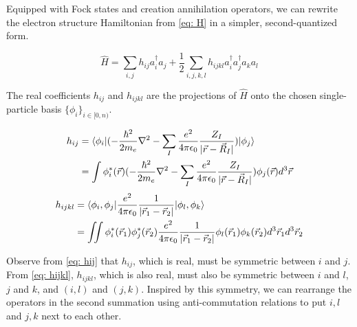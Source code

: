 Equipped with Fock states and creation annihilation operators, we can rewrite the electron structure Hamiltonian from \eqref{eq: H} in a simpler, second-quantized form.

\begin{equation}
    \hat{H} = \sum_{i, j} h_{ij}a^\dag_ia_j + \frac{1}{2}\sum_{i,j,k,l} h_{ijkl}a^\dag_ia^\dag_ja_ka_l \label{eq: H2}
\end{equation}

The real coefficients $h_{ij}$ and $h_{ijkl}$ are the projections of $\hat{H}$ onto the chosen single-particle basis $\{\phi_i\}_{i \in [0, n)}$.

\begin{equation}
    \begin{split}
        h_{ij} &= \braket{\phi_i | (-\frac{\hbar^2}{2m_e}\nabla^2 - \sum_I \frac{e^2}{4\pi\epsilon_0}\frac{Z_I}{|\vec{r} - \vec{R}_I|}) | \phi_j} \\
        &= \int \phi^*_i(\vec{r})(-\frac{\hbar^2}{2m_e}\nabla^2 - \sum_I \frac{e^2}{4\pi\epsilon_0}\frac{Z_I}{|\vec{r} - \vec{R}_I|})\phi_j(\vec{r}) d^3\vec{r}
    \end{split}
    \label{eq: hij}
\end{equation}
\begin{equation}
    \begin{split}
        h_{ijkl} &= \braket{\phi_i, \phi_j | \frac{e^2}{4\pi\epsilon_0}\frac{1}{|\vec{r}_1 - \vec{r}_2|} | \phi_l, \phi_k} \\
        &= \iint \phi^*_i(\vec{r}_1)\phi^*_j(\vec{r}_2)\frac{e^2}{4\pi\epsilon_0}\frac{1}{|\vec{r}_1 - \vec{r}_2|}\phi_l(\vec{r}_1)\phi_k(\vec{r}_2) d^3\vec{r}_1d^3\vec{r}_2
    \end{split}
    \label{eq: hijkl}
\end{equation}

Observe from \eqref{eq: hij} that $h_{ij}$, which is real, must be symmetric between $i$ and $j$. From \eqref{eq: hijkl}, $h_{ijkl}$, which is also real, must also be symmetric between $i$ and $l$, $j$ and $k$, and $(i, l)$ and $(j, k)$. Inspired by this symmetry, we can rearrange the operators in the second summation using anti-commutation relations to put $i, l$ and $j, k$ next to each other.

